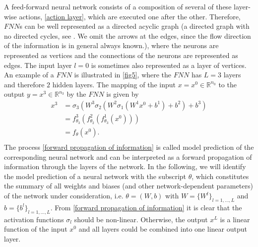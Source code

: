 A feed-forward neural network consists of a composition of several of these layer-wise actions, \cref{action layer}, which are executed one after the other. Therefore, $FNN$s can be well represented as a directed acyclic graph (a directed graph with no directed cycles, see \cite[section~5.7]{thulasiraman2011graphs}. We omit the arrows at the edges, since the flow direction of the information is in general always known.), where the neurons are represented as vertices and the connections of the neurons are represented as edges. The input layer $l=0$ is sometimes also represented as a layer of vertices. An example of a $FNN$ is illustrated in \cref{fig5}, where the $FNN$ has $L=3$ layers and therefore $2$ hidden layers. The mapping of the input $x = x^0 \in \mathbb{R}^{n_0}$ to the output $y = x^3 \in \mathbb{R}^{n_3}$ by the $FNN$ is given by 
\begin{equation}
    \label{forward propagation of information}
    \begin{aligned}
        x^3 &=\sigma_{3} \left( W^{3} \sigma_{2} \left(  W^{2} \sigma_{1} \left( W^{1} x^{0}+b^{1}\right)+b^{2}\right)+b^{3}\right) \\
        & =f^{3}_{\theta_3} \left( f^{2}_{\theta_2} \left( f^{1}_{\theta_3} \left(x^{0} \right) \right) \right) \\
        & = f_{\theta} \left( x^{0}\right). \\
    \end{aligned}
\end{equation}
The process \cref{forward propagation of information} is called model prediction of the corresponding neural network and can be interpreted as a forward propagation of information through the layers of the network. In the following, we will identify the model prediction of a neural network with the subscript $\theta$, which constitutes the summary of all weights and biases (and other network-dependent parameters) of the network under consideration, i.e. $\theta = (W,b)$ with $W = \{ W^l \}_{l = 1, \ldots, L}$ and $b = \{ b^l \}_{l = 1, \ldots, L}$. From \cref{forward propagation of information} it is clear that the activation functions $\sigma_l$ should be non-linear. Otherwise, the output $x^L$ is a linear function of the input $x^0$ and all layers could be combined into one linear output layer. \\

